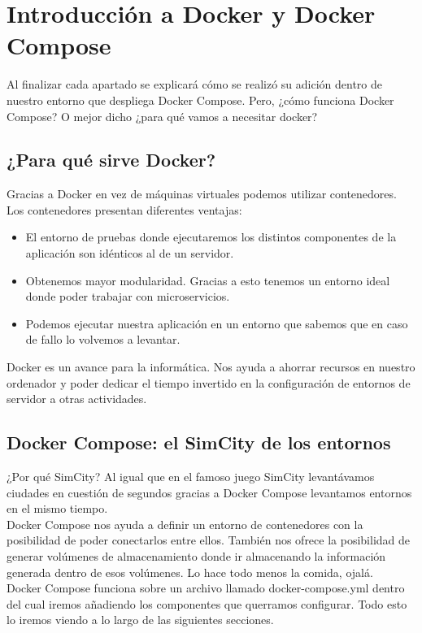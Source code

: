 \section{Introducción a Docker y Docker Compose}
Al finalizar cada apartado se explicará cómo se realizó su adición dentro de nuestro entorno que despliega Docker Compose. Pero, ¿cómo funciona Docker Compose? O mejor dicho ¿para qué vamos a necesitar docker?

\subsection{¿Para qué sirve Docker?}
Gracias a Docker en vez de máquinas virtuales podemos utilizar contenedores. Los contenedores presentan diferentes ventajas:

\begin{itemize}
    \item El entorno de pruebas donde ejecutaremos los distintos componentes de la aplicación son idénticos al de un servidor.
    \item Obtenemos mayor modularidad. Gracias a esto tenemos un entorno ideal donde poder trabajar con microservicios.
    \item Podemos ejecutar nuestra aplicación en un entorno que sabemos que en caso de fallo lo volvemos a levantar.
\end{itemize}

Docker es un avance para la informática. Nos ayuda a ahorrar recursos en nuestro ordenador y poder dedicar el tiempo invertido en la configuración de entornos de servidor a otras actividades.

\subsection{Docker Compose: el SimCity de los entornos}

¿Por qué SimCity? Al igual que en el famoso juego SimCity levantávamos ciudades en cuestión de segundos gracias a Docker Compose levantamos entornos en el mismo tiempo.
\\Docker Compose nos ayuda a definir un entorno de contenedores con la posibilidad de poder conectarlos entre ellos. También nos ofrece la posibilidad de generar volúmenes de almacenamiento donde ir almacenando la información generada dentro de esos volúmenes. Lo hace todo menos la comida, ojalá.
\\Docker Compose funciona sobre un archivo llamado docker-compose.yml dentro del cual iremos añadiendo los componentes que querramos configurar. Todo esto lo iremos viendo a lo largo de las siguientes secciones.